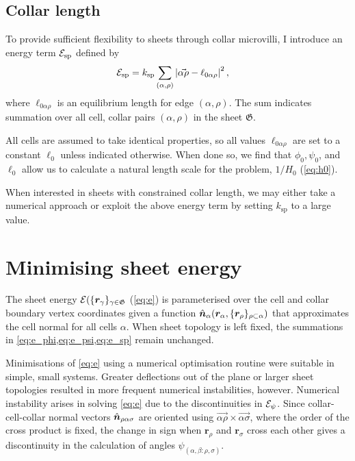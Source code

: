 \subsection{Collar length}

To provide sufficient flexibility to sheets through collar microvilli, I introduce an energy term $\mathcal{E}_{\text{sp}}$ defined by 
\begin{align}
	\mathcal{E}_{\text{sp}} &= k_{\text{sp}} \sum_{(\alpha, \rho)} \left| \vec{\alpha\rho} - \ell_{0\alpha\rho} \right|^2, \label{eq:e_sp}
\end{align}
\noindent where $\ell_{0\alpha\rho}$ is an equilibrium length for edge $(\alpha, \rho)$. The sum indicates summation over all cell, collar pairs $(\alpha, \rho)$ in the sheet $\mathfrak{G}$.

All cells are assumed to take identical properties, so all values $\ell_{0\alpha\rho}$ are set to a constant $\ell_0$ unless indicated otherwise. 
When done so, we find that $\phi_0, \psi_0$, and $\ell_0$ allow us to calculate a natural length scale for the problem, $1/H_0$ (\cref{eq:h0}).

When interested in sheets with constrained collar length, we may either take a numerical approach or exploit the above energy term by setting $k_{\text{sp}}$ to a large value. 

\section{Minimising sheet energy} \label{sec:minimise_energy}

The sheet energy $\mathcal{E}(\{\bm{r}_\gamma \}_{\gamma \in \mathfrak{G}}$ (\cref{eq:e}) is parameterised over the cell and collar boundary vertex coordinates given a function $\hat{\bm{n}}_\alpha(\bm{r}_\alpha, \{\bm{r}_\rho \}_{\rho\subset\alpha})$ that approximates the cell normal for all cells $\alpha$.
When sheet topology is left fixed, the summations in \cref{eq:e_phi,eq:e_psi,eq:e_sp} remain unchanged.

Minimisations of \cref{eq:e} using a numerical optimisation routine were suitable in simple, small systems. 
Greater deflections out of the plane or larger sheet topologies resulted in more frequent numerical instabilities, however.
Numerical instability arises in solving \cref{eq:e} due to the discontinuities in $\mathcal{E}_\psi$. 
Since collar-cell-collar normal vectors $\hat{\bm{n}}_{\rho\alpha\sigma}$ are oriented using $\vec{\alpha\rho} \times\vec{\alpha\sigma}$, where the order of the cross product is fixed, the change in sign when $\bm{r}_\rho$ and $\bm{r}_\sigma$ cross each other gives a discontinuity in the calculation of angles $\psi_{(\alpha,\beta:\rho,\sigma)}$. 


